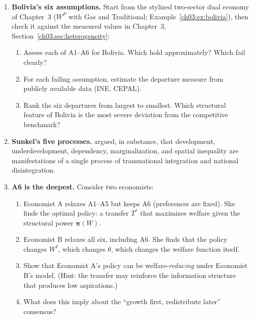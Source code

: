 \documentclass[../structural_economics_book.tex]{subfiles}
\begin{document}
\begin{enumerate}[label=\textbf{4.\arabic*}, leftmargin=3em]
\item \textbf{Bolivia's six assumptions.} Start from the stylized two-sector dual economy of Chapter~3 ($W^P$ with Gas and Traditional; Example~\ref{ch03:ex:bolivia}), then check it against the measured values in Chapter~3, Section~\ref{ch03:sec:heterogeneity}:
\begin{enumerate}
\item Assess each of A1--A6 for Bolivia. Which hold approximately? Which fail clearly?
\item For each failing assumption, estimate the departure measure from publicly available data (INE, CEPAL).
\item Rank the six departures from largest to smallest. Which structural feature of Bolivia is the most severe deviation from the competitive benchmark?
\end{enumerate}

\item \textbf{Sunkel's five processes.} \citet{sunkel1971capitalismo} argued, in substance, that development, underdevelopment, dependency, marginalization, and spatial inequality are manifestations of a single process of transnational integration and national disintegration.

\item \textbf{A6 is the deepest.} Consider two economists:
\begin{enumerate}
\item Economist A relaxes A1--A5 but keeps A6 (preferences are fixed). She finds the optimal policy: a transfer $T^*$ that maximizes welfare given the structural power $\boldsymbol{\pi}(W)$.
\item Economist B relaxes all six, including A6. She finds that the policy changes $W^I$, which changes $\theta$, which changes the welfare function itself.
\item Show that Economist A's policy can be welfare-\textit{reducing} under Economist B's model. (Hint: the transfer may reinforce the information structure that produces low aspirations.)
\item What does this imply about the ``growth first, redistribute later'' consensus?
\end{enumerate}


\end{enumerate}
\end{document}
